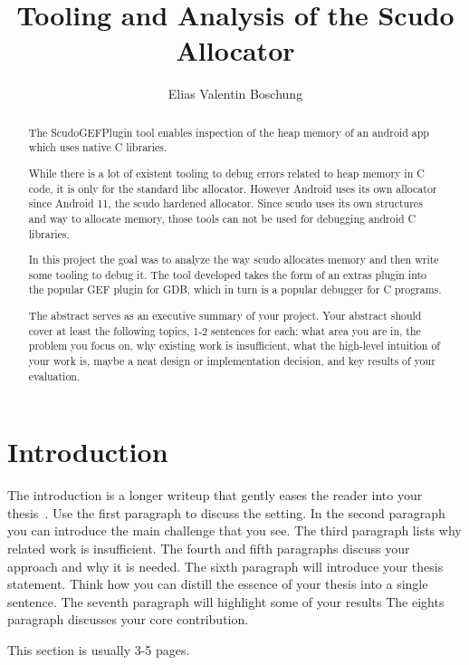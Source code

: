 \documentclass[a4paper,11pt,oneside]{report}
\title{Tooling and Analysis of the Scudo Allocator}
\author{Elias Valentin Boschung}
\newcommand{\sysname}{ScudoGEFPlugin\xspace}
\begin{document}
\maketitle{}
\makededication{}
\makeacks{}

\begin{abstract}
  The \sysname{} tool enables inspection of the heap memory of an android app
  which uses native C libraries.

  While there is a lot of existent tooling to debug errors related to heap
  memory in C code, it is only for the standard libc allocator. However
  Android uses its own allocator since Android 11, the scudo hardened
  allocator. Since scudo uses its own structures and way to allocate memory,
  those tools can not be used for debugging android C libraries.

  In this project the goal was to analyze the way scudo allocates memory and
  then write some tooling to debug it. The tool developed takes the form of
  an extras plugin into the popular GEF plugin for GDB, which in turn is a
  popular debugger for C programs.
  
The abstract serves as an executive summary of your project.
Your abstract should cover at least the following topics, 1-2 sentences for
each: what area you are in, the problem you focus on, why existing work is
insufficient, what the high-level intuition of your work is, maybe a neat
design or implementation decision, and key results of your evaluation.
\end{abstract}

\maketoc{}

\chapter{Introduction}

The introduction is a longer writeup that gently eases the reader into your
thesis~\cite{dinesh20oakland}. Use the first paragraph to discuss the setting.
In the second paragraph you can introduce the main challenge that you see.
The third paragraph lists why related work is insufficient.
The fourth and fifth paragraphs discuss your approach and why it is needed.
The sixth paragraph will introduce your thesis statement. Think how you can
distill the essence of your thesis into a single sentence.
The seventh paragraph will highlight some of your results
The eights paragraph discusses your core contribution.

This section is usually 3-5 pages.
\end{document}

